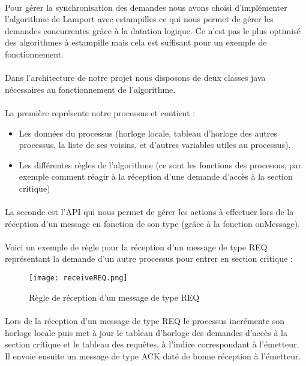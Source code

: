 \documentclass[a4paper,10pt]{report}
\begin{document}
\paragraph{}
Pour gérer la synchronisation des demandes nous avons choisi d'implémenter l'algorithme de Lamport avec estampilles ce qui nous permet de gérer les demandes concurrentes grâce à la datation logique. Ce n'est pas le plus optimisé des algorithmes à estampille mais cela est suffisant pour un exemple de fonctionnement.
\paragraph{}
Dans l'architecture de notre projet nous disposons de deux classes java nécessaires au fonctionnement de l'algorithme.
\paragraph{}
La première représente notre processus et contient :
\newline
\begin{itemize}
    \item Les données du processus (horloge locale, tableau d'horloge des autres processus, la liste de ses voisins, et d'autres variables utiles au processus).
    \newline
    \item Les différentes règles de l'algorithme (ce sont les fonctions des processus, par exemple comment réagir à la réception d'une demande d'accès à la section critique)
\end{itemize}
\paragraph{}
La seconde est l'API qui nous permet de gérer les actions à effectuer lors de la réception d'un message en fonction de son type (grâce à la fonction onMessage).
\newpage
\paragraph{}
Voici un exemple de règle pour la réception d'un message de type REQ représentant la demande d'un autre processus pour entrer en section critique :
\begin{figure}[h]
    \centering
    \texttt{[image: receiveREQ.png]}
    \caption{Règle de réception d'un message de type REQ}
\end{figure}


\paragraph{}
Lors de la réception d'un message de type REQ le processus incrémente son horloge locale puis met à jour le tableau d'horloge des demandes d'accès à la section critique et le tableau des requêtes, à l'indice correspondant à l'émetteur. Il envoie ensuite un message de type ACK daté de bonne réception à l'émetteur.
\newpage
\end{document}
